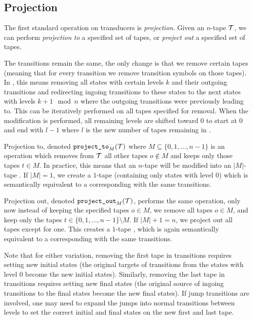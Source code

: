 \subsection{Projection}\label{sec:projection}

The first standard operation on transducers is \emph{projection}.
Given an $n$-tape \nft $\mathcal{T}$, we can perform \emph{projection to} a specified set of tapes, or \emph{project out} a specified set of tapes.

The transitions remain the same, the only change is that we remove certain tapes (meaning that for every \nft transition we remove transition symbols on those tapes).
In \mata, this means removing all states with certain levels $k$ and their outgoing transitions and redirecting ingoing transitions to these states to the next states with levels $k + 1 \mod n$ where the outgoing transitions were previously leading to.
This can be iteratively performed on all tapes specified for removal.
When the modification is performed, all remaining levels are shifted toward $0$ to start at $0$ and end with $l - 1$ where $l$ is the new number of tapes remaining in \nft.

Projection to, denoted $\texttt{project\_to}_{M}(\mathcal{T})$ where $M \subseteq \{ 0, 1, \ldots, n - 1 \} $ is an operation which removes from $\mathcal{T}$ all other tapes $o \notin M$ and keeps only those tapes $t \in M$.
In practice, this means that an $n$-tape \nft will be modified into an $|M|$-tape \nft.
If $|M| = 1$, we create a $1$-tape \nft (containing only states with level $0$) which is semantically equivalent to a corresponding \nfa with the same transitions.

Projection out, denoted $\texttt{project\_out}_{M}(\mathcal{T})$, performs the same operation, only now instead of keeping the specified tapes $o \in M$, we remove all tapes $o \in M$, and keep only the tapes $t \in \{ 0, 1, \ldots, n - 1 \} \setminus M$.
If $|M| + 1 = n$, we project out all tapes except for one.
This creates a $1$-tape \nft, which is again semantically equivalent to a corresponding \nfa with the same transitions.

Note that for either variation, removing the first tape in \nft transitions requires setting new initial states (the original targets of transitions from the states with level $0$ become the new initial states).
Similarly, removing the last tape in \nft transitions requires setting new final states (the original source of ingoing transitions to the final states become the new final states).
If jump transitions are involved, one may need to expand the jumps into normal transitions between levels to set the correct initial and final states on the new first and last tape.

